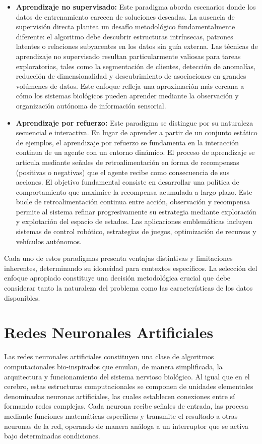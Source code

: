 \begin{itemize}
    \item \textbf{Aprendizaje no supervisado:} Este paradigma aborda escenarios donde los datos de entrenamiento carecen de soluciones deseadas. La ausencia de supervisión directa plantea un desafío metodológico fundamentalmente diferente: el algoritmo debe descubrir estructuras intrínsecas, patrones latentes o relaciones subyacentes en los datos sin guía externa. Las técnicas de aprendizaje no supervisado resultan particularmente valiosas para tareas exploratorias, tales como la segmentación de clientes, detección de anomalías, reducción de dimensionalidad y descubrimiento de asociaciones en grandes volúmenes de datos. Este enfoque refleja una aproximación más cercana a cómo los sistemas biológicos pueden aprender mediante la observación y organización autónoma de información sensorial.
    
    \item \textbf{Aprendizaje por refuerzo:} Este paradigma se distingue por su naturaleza secuencial e interactiva. En lugar de aprender a partir de un conjunto estático de ejemplos, el aprendizaje por refuerzo se fundamenta en la interacción continua de un agente con un entorno dinámico. El proceso de aprendizaje se articula mediante señales de retroalimentación en forma de recompensas (positivas o negativas) que el agente recibe como consecuencia de sus acciones. El objetivo fundamental consiste en desarrollar una política de comportamiento que maximice la recompensa acumulada a largo plazo.
     Este bucle de retroalimentación continua entre acción, observación y recompensa permite al sistema refinar progresivamente su estrategia mediante exploración y explotación del espacio de estados. Las aplicaciones emblemáticas incluyen sistemas de control robótico, estrategias de juegos, optimización de recursos y vehículos autónomos.
\end{itemize}
%

Cada uno de estos paradigmas presenta ventajas distintivas y limitaciones inherentes, determinando su idoneidad para contextos específicos. La selección del enfoque apropiado constituye una decisión metodológica crucial que debe considerar tanto la naturaleza del problema como las características de los datos disponibles.
%

\section{Redes Neuronales Artificiales}
%

Las redes neuronales artificiales constituyen una clase de algoritmos computacionales bio-inspirados que emulan, de manera simplificada, la arquitectura y funcionamiento del sistema nervioso biológico. Al igual que en el cerebro, estas estructuras computacionales se componen de unidades elementales denominadas neuronas artificiales, las cuales establecen conexiones entre sí formando redes complejas. Cada neurona recibe señales de entrada, las procesa mediante funciones matemáticas específicas y transmite el resultado a otras neuronas de la red, operando de manera análoga a un interruptor que se activa bajo determinadas condiciones.
%

